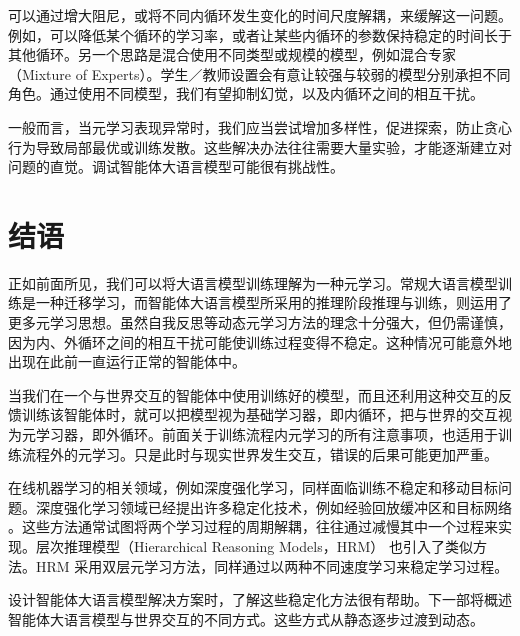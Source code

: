可以通过增大阻尼，或将不同内循环发生变化的时间尺度解耦，来缓解这一问题。例如，可以降低某个循环的学习率，或者让某些内循环的参数保持稳定的时间长于其他循环。另一个思路是混合使用不同类型或规模的模型，例如混合专家（Mixture of Experts）\citep{jiang2024mixtralexperts}。学生／教师设置会有意让较强与较弱的模型分别承担不同角色。通过使用不同模型，我们有望抑制幻觉，以及内循环之间的相互干扰。

一般而言，当元学习表现异常时，我们应当尝试增加多样性，促进探索，防止贪心行为导致局部最优或训练发散。这些解决办法往往需要大量实验，才能逐渐建立对问题的直觉。调试智能体大语言模型可能很有挑战性。

\section{结语}
正如前面所见，我们可以将大语言模型训练理解为一种元学习。常规大语言模型训练是一种迁移学习，而智能体大语言模型所采用的推理阶段推理与训练，则运用了更多元学习思想。虽然自我反思等动态元学习方法的理念十分强大，但仍需谨慎，因为内、外循环之间的相互干扰可能使训练过程变得不稳定。这种情况可能意外地出现在此前一直运行正常的智能体中。

当我们在一个与世界交互的智能体中使用训练好的模型，而且还利用这种交互的反馈训练该智能体时，就可以把模型视为基础学习器，即内循环，把与世界的交互视为元学习器，即外循环。前面关于训练流程内元学习的所有注意事项，也适用于训练流程外的元学习。只是此时与现实世界发生交互，错误的后果可能更加严重。

在线机器学习的相关领域，例如深度强化学习，同样面临训练不稳定和移动目标问题。深度强化学习领域已经提出许多稳定化技术，例如经验回放缓冲区和目标网络 \citep{mnih2015human,hessel2018rainbow}。这些方法通常试图将两个学习过程的周期解耦，往往通过减慢其中一个过程来实现。层次推理模型（Hierarchical Reasoning Models，HRM）\citep{wang2025hierarchical} 也引入了类似方法。HRM 采用双层元学习方法，同样通过以两种不同速度学习来稳定学习过程。

设计智能体大语言模型解决方案时，了解这些稳定化方法很有帮助。下一部将概述智能体大语言模型与世界交互的不同方式。这些方式从静态逐步过渡到动态。



